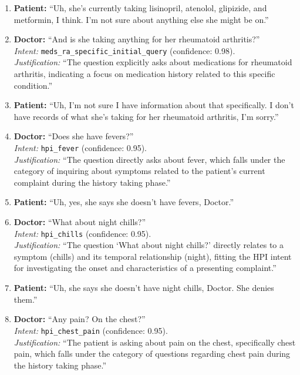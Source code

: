 \begin{enumerate}
  \item \textbf{Patient:} ``Uh, she's currently taking lisinopril, atenolol, glipizide, and metformin, I think. I'm not sure about anything else she might be on.''

  \item \textbf{Doctor:} ``And is she taking anything for her rheumatoid arthritis?'' \\
  \emph{Intent:} \texttt{meds\_ra\_specific\_initial\_query} (confidence: 0.98). \\
  \emph{Justification:} ``The question explicitly asks about medications for rheumatoid arthritis, indicating a focus on medication history related to this specific condition.''

  \item \textbf{Patient:} ``Uh, I'm not sure I have information about that specifically. I don't have records of what she's taking for her rheumatoid arthritis, I'm sorry.''

  \item \textbf{Doctor:} ``Does she have fevers?'' \\
  \emph{Intent:} \texttt{hpi\_fever} (confidence: 0.95). \\
  \emph{Justification:} ``The question directly asks about fever, which falls under the category of inquiring about symptoms related to the patient's current complaint during the history taking phase.''

  \item \textbf{Patient:} ``Uh, yes, she says she doesn't have fevers, Doctor.''

  \item \textbf{Doctor:} ``What about night chills?'' \\
  \emph{Intent:} \texttt{hpi\_chills} (confidence: 0.95). \\
  \emph{Justification:} ``The question `What about night chills?' directly relates to a symptom (chills) and its temporal relationship (night), fitting the HPI intent for investigating the onset and characteristics of a presenting complaint.''

  \item \textbf{Patient:} ``Uh, she says she doesn't have night chills, Doctor. She denies them.''

  \item \textbf{Doctor:} ``Any pain? On the chest?'' \\
  \emph{Intent:} \texttt{hpi\_chest\_pain} (confidence: 0.95). \\
  \emph{Justification:} ``The patient is asking about pain on the chest, specifically chest pain, which falls under the category of questions regarding chest pain during the history taking phase.''


\end{enumerate}
